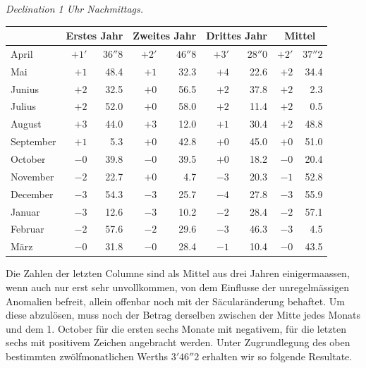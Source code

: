 \begin{center}\small
\textit{Declination 1 Uhr Nachmittags.}\par\smallskip
\begin{tabular}{l|rr|rr|rr||rr}
&\multicolumn{2}{c|}{Erstes Jahr}&\multicolumn{2}{c|}{Zweites Jahr}&\multicolumn{2}{c||}{Drittes Jahr}&\multicolumn{2}{c}{Mittel}\\\hline
April&$+1'$&$36''8$&$+2'$&$46''8$&$+3'$&$28''0$&$+2'$&$37''2$\\
Mai&$+1$&48.4&$+1$&32.3&$+4$&22.6&$+2$&34.4\\
Junius&$+2$&32.5&$+0$&56.5&$+2$&37.8&$+2$&2.3\\
Julius&$+2$&52.0&$+0$&58.0&$+2$&11.4&$+2$&0.5\\
August&$+3$&44.0&$+3$&12.0&$+1$&30.4&$+2$&48.8\\
September&$+1$&5.3&$+0$&42.8&$+0$&45.0&$+0$&51.0\\
October&$-0$&39.8&$-0$&39.5&$+0$&18.2&$-0$&20.4\\
November&$-2$&22.7&$+0$&4.7&$-3$&20.3&$-1$&52.8\\
December&$-3$&54.3&$-3$&25.7&$-4$&27.8&$-3$&55.9\\
Januar&$-3$&12.6&$-3$&10.2&$-2$&28.4&$-2$&57.1\\
Februar&$-2$&57.6&$-2$&29.6&$-3$&46.3&$-3$&4.5\\
März&$-0$&31.8&$-0$&28.4&$-1$&10.4&$-0$&43.5
\end{tabular}
\end{center}
Die Zahlen der letzten Columne sind als Mittel aus drei Jahren einigermaassen, wenn auch nur erst sehr unvollkommen, von dem Einflusse der unregelmässigen Anomalien befreit, allein offenbar noch mit der Säcularänderung behaftet. Um diese abzulösen, muss noch der Betrag derselben zwischen der
Mitte jedes Monats und dem 1. October für die ersten sechs Monate mit negativem, für die letzten sechs mit positivem Zeichen angebracht werden. Unter Zugrundlegung des oben bestimmten zwölfmonatlichen Werths $3'46''2$ erhalten wir so folgende Resultate.
